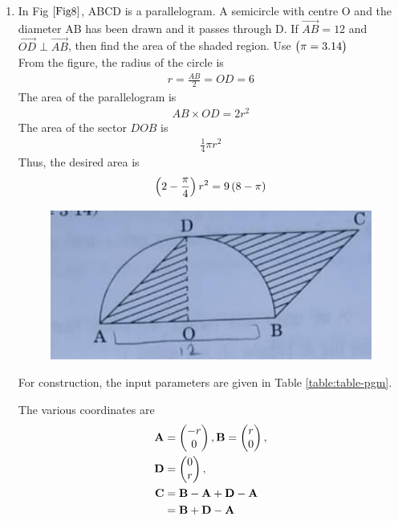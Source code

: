 \documentclass[journal,12pt,twocolumn]{IEEEtran}
\begin{document}
\begin{enumerate}
    \item In Fig $\ref{Fig8}$, ABCD is a parallelogram. A semicircle with centre O and the diameter AB has been drawn and it passes through D. If $\Vec{AB} = 12$ and $\Vec{OD} \perp \Vec{AB}$, then find the area of the shaded region. Use $\begin{pmatrix}\pi = 3.14\end{pmatrix}$\\
	    \solution From the figure, the radius of the circle is  
	    \begin{align}
		    r = \frac{AB}{2} = OD = 6
	    \end{align}
	    The area of the parallelogram is 
	    \begin{align}
		    AB \times OD = 2r^2 
	    \end{align}
	    The area of the sector $DOB$ is 
	    \begin{align}
		    \frac{1}{4}\pi r^2 
	    \end{align}
	    Thus, the desired area is 
	    \begin{align}
		    \left(2 -  \frac{\pi}{4}\right) r^2 = 9\left(8 - \pi\right)
	    \end{align}
    \begin{figure}[h!]
        \centering
        \includegraphics[width=0.5\columnwidth]{Fig8.png}
    	\caption{}
    	\label{Fig8}
     \end{figure} 
     For construction, the input parameters are given in Table 
\ref{table:table-pgm}.	
\begin{table}[ht!]
	
\caption{}
\label{table:table-pgm}	
\end{table}
The various coordinates are 
\begin{align}
	\mathbf{A} &= \begin{pmatrix}-r \\ 0\end{pmatrix},
	\mathbf{B} = \begin{pmatrix}r \\ 0\end{pmatrix},
	\\
	\mathbf{D} &= \begin{pmatrix}0 \\ r\end{pmatrix},
	\\
	\mathbf{C} &= \mathbf{B}-\mathbf{A} + \mathbf{D}-\mathbf{A}
	\\
	&= \mathbf{B}+ \mathbf{D}-\mathbf{A}
\end{align}


\end{enumerate}
\end{document}
